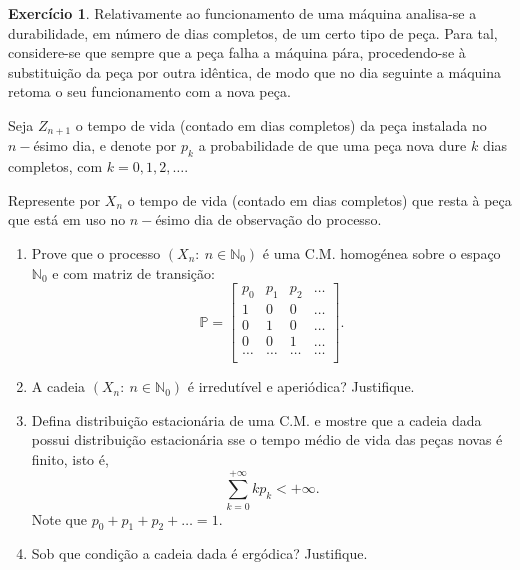 \documentclass[
  11pt,
  a4paper,
]{book}
\theoremstyle{definition}
\theoremstyle{definition}
\theoremstyle{definition}
\newtheorem{exercise}{Exercício}[chapter]
\theoremstyle{definition}
\theoremstyle{remark}
\begin{document}
\begin{exercise}

Relativamente ao funcionamento de uma máquina analisa-se a durabilidade, em número de dias completos, de um certo tipo de peça. Para tal, considere-se que sempre que a peça falha a máquina pára, procedendo-se à substituição da peça por outra idêntica, de modo que no dia seguinte a máquina retoma o seu funcionamento com a nova peça.

Seja \(Z_{n+1}\) o tempo de vida (contado em dias completos) da peça instalada no \(n-\)ésimo dia, e denote por \(p_k\) a probabilidade de que uma peça nova dure \(k\) dias completos, com \(k=0,1,2,\dots\).

Represente por \(X_n\) o tempo de vida (contado em dias completos) que resta à peça que está em uso no \(n-\)ésimo dia de observação do processo.

\begin{enumerate}
\def\labelenumi{(\alph{enumi})}
\item
  Prove que o processo \((X_n: ~n \in \mathbb{N}_0)\) é uma C.M. homogénea sobre o espaço \(\mathbb{N}_0\) e com matriz de transição:
  \[
  \mathbb{P} =
  \begin{bmatrix}
  p_0 & p_1 & p_2 & \dots   \\
  1 & 0 & 0 & \dots   \\
  0 & 1 & 0 & \dots   \\
  0 & 0 & 1 & \dots   \\
  \dots & \dots & \dots & \dots   \\
  \end{bmatrix}.
  \]
\item
  A cadeia \((X_n: ~n \in \mathbb{N}_0)\) é irredutível e aperiódica? Justifique.
\item
  Defina distribuição estacionária de uma C.M. e mostre que a cadeia dada possui distribuição estacionária sse o tempo médio de vida das peças novas é finito, isto é,
  \[\sum\limits_{k=0}^{+\infty}kp_k<+\infty.\]
  Note que \(p_0+p_1+p_2+\dots=1\).
\item
  Sob que condição a cadeia dada é ergódica? Justifique.
\end{enumerate}

\end{exercise}

\(\,\)
\end{document}
